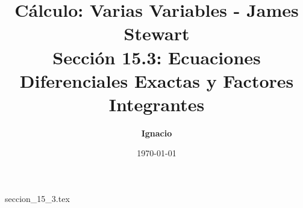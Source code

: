 \documentclass[11pt,spanish,oneside]{report}
\title{\textbf{Cálculo: Varias Variables - James Stewart} \\ \Large Sección 15.3: Ecuaciones Diferenciales Exactas y Factores Integrantes}
\author{\textbf{Ignacio}}
\date{\today}
\begin{document}
\maketitle

{seccion_15_3.tex}
\end{document}
